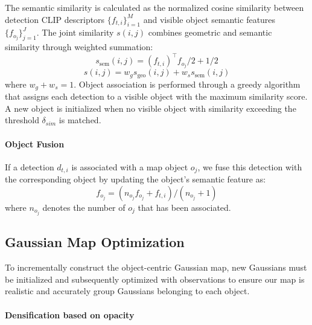 The semantic similarity is calculated as the normalized cosine similarity between detection CLIP descriptors $\{f_{t, i}\}_{i=1}^{M}$ and visible object semantic features $\{f_{o_j}\}_{j=1}^{J}$. The joint similarity $ s(i,j) $ combines geometric and semantic similarity through weighted summation:
\begin{equation}
s_{\text{sem}}(i,j) = (f_{t,i})^\top f_{o_j} /2+1/2
\end{equation}
\begin{equation}
s(i,j) = w_g s_{\text{geo}}(i,j) + w_s s_{\text{sem}}(i,j)
\end{equation}
where $ w_g + w_s=1 $. Object association is performed through a greedy algorithm that assigns each detection to a visible object with the maximum similarity score. A new object is initialized when no visible object with similarity exceeding the threshold $\delta_{sim}$ is matched.

\paragraph{Object Fusion}
\label{para:obj_fusion}

If a detection $d_{t,i}$ is associated with a map object $o_j$, we fuse this detection with the corresponding object by updating the object’s semantic feature as:
\begin{equation}
f_{o_j}=(n_{o_j}f_{o_j}+f_{t,i})/(n_{o_j}+1)
\end{equation}
where $n_{o_j}$ denotes the number of $o_j$ that has been associated.

\subsection{Gaussian Map Optimization}
\label{subsec:gaussian_optim}
To incrementally construct the object-centric Gaussian map, new Gaussians must be initialized and subsequently optimized with observations to ensure our map is realistic and accurately group Gaussians belonging to each object.

\paragraph{Densification based on opacity}
\label{para:densification}


